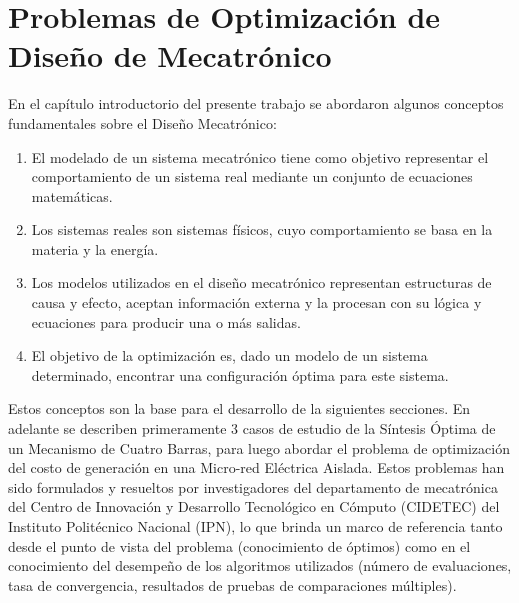 \chapter{Problemas de Optimización de Diseño de Mecatrónico} 
\label{Chapter5} 
En el capítulo introductorio del presente trabajo se abordaron algunos conceptos fundamentales sobre el Diseño Mecatrónico:
\begin{enumerate}
\item El modelado de un sistema mecatrónico tiene como objetivo representar el comportamiento de un sistema real mediante un conjunto de ecuaciones matemáticas.
\item Los sistemas reales son sistemas físicos, cuyo comportamiento se basa en la materia y la energía.
\item   Los modelos utilizados en el diseño mecatrónico representan estructuras de causa y efecto, aceptan información externa y la procesan con su lógica y ecuaciones para producir una o más salidas. 
\item El objetivo de la optimización es, dado un modelo de un sistema determinado, encontrar una configuración óptima para este sistema. 
\end{enumerate}
Estos conceptos son la base para el desarrollo de la siguientes secciones. En adelante se describen primeramente 3 casos de estudio de la Síntesis Óptima de un Mecanismo de Cuatro Barras, para luego abordar el problema de optimización del costo de generación en una Micro-red Eléctrica Aislada. Estos problemas han sido formulados y resueltos por investigadores del departamento de mecatrónica del Centro de Innovación y Desarrollo Tecnológico en Cómputo (CIDETEC) del Instituto Politécnico Nacional (IPN), lo que brinda un marco de referencia tanto desde el punto de vista del problema (conocimiento de óptimos) como en el conocimiento del desempeño de los algoritmos utilizados (número de evaluaciones, tasa de convergencia, resultados de pruebas de comparaciones múltiples).
